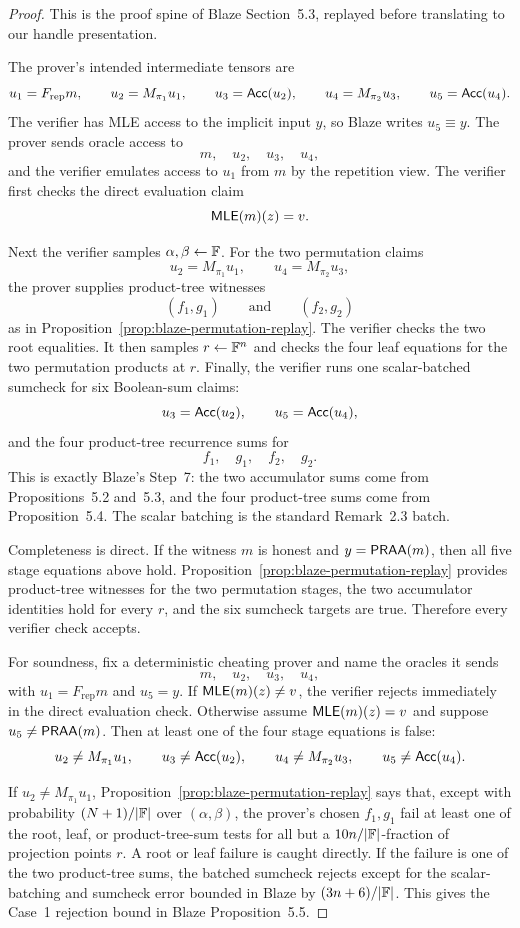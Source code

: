 \begin{proof}
This is the proof spine of Blaze Section~5.3, replayed before translating to
our handle presentation.

The prover's intended intermediate tensors are
\[
  u_1=F_{\mathrm{rep}}m,\qquad
  u_2=M_{\pi_1}u_1,\qquad
  u_3=\mathsf{Acc}(u_2),\qquad
  u_4=M_{\pi_2}u_3,\qquad
  u_5=\mathsf{Acc}(u_4).
\]
The verifier has MLE access to the implicit input \(y\), so Blaze writes
\(u_5\equiv y\).  The prover sends oracle access to
\[
  m,\quad u_2,\quad u_3,\quad u_4,
\]
and the verifier emulates access to \(u_1\) from \(m\) by the repetition view.
The verifier first checks the direct evaluation claim
\[
  \mathsf{MLE}(m)(z)=v.
\]

Next the verifier samples \(\alpha,\beta\leftarrow\mathbb{F}\).  For the two
permutation claims
\[
  u_2=M_{\pi_1}u_1,
  \qquad
  u_4=M_{\pi_2}u_3,
\]
the prover supplies product-tree witnesses
\[
  (f_1,g_1)
  \qquad\text{and}\qquad
  (f_2,g_2)
\]
as in Proposition~\ref{prop:blaze-permutation-replay}.  The verifier checks the
two root equalities.  It then samples \(r\leftarrow\mathbb{F}^n\) and checks the four
leaf equations for the two permutation products at \(r\).  Finally, the
verifier runs one scalar-batched sumcheck for six Boolean-sum claims:
\[
  u_3=\mathsf{Acc}(u_2),\qquad
  u_5=\mathsf{Acc}(u_4),
\]
and the four product-tree recurrence sums for
\[
  f_1,\quad g_1,\quad f_2,\quad g_2.
\]
This is exactly Blaze's Step~7: the two accumulator sums come from
Propositions~5.2 and~5.3, and the four product-tree sums come from
Proposition~5.4.  The scalar batching is the standard Remark~2.3 batch.

Completeness is direct.  If the witness \(m\) is honest and \(y=\mathsf{PRAA}(m)\),
then all five stage equations above hold.  Proposition~\ref{prop:blaze-permutation-replay}
provides product-tree witnesses for the two permutation stages, the two
accumulator identities hold for every \(r\), and the six sumcheck targets are
true.  Therefore every verifier check accepts.

For soundness, fix a deterministic cheating prover and name the oracles it
sends
\[
  m,\quad u_2,\quad u_3,\quad u_4,
\]
with \(u_1=F_{\mathrm{rep}}m\) and \(u_5=y\).  If \(\mathsf{MLE}(m)(z)\ne v\), the
verifier rejects immediately in the direct evaluation check.  Otherwise assume
\(\mathsf{MLE}(m)(z)=v\) and suppose \(u_5\ne\mathsf{PRAA}(m)\).  Then at least one of the four
stage equations is false:
\[
  u_2\ne M_{\pi_1}u_1,\qquad
  u_3\ne\mathsf{Acc}(u_2),\qquad
  u_4\ne M_{\pi_2}u_3,\qquad
  u_5\ne\mathsf{Acc}(u_4).
\]

If \(u_2\ne M_{\pi_1}u_1\), Proposition~\ref{prop:blaze-permutation-replay}
says that, except with probability \((N+1)/|\mathbb{F}|\) over
\((\alpha,\beta)\), the prover's chosen \(f_1,g_1\) fail at least one of the
root, leaf, or product-tree-sum tests for all but a \(10n/|\mathbb{F}|\)-fraction of
projection points \(r\).  A root or leaf failure is caught directly.  If the
failure is one of the two product-tree sums, the batched sumcheck rejects
except for the scalar-batching and sumcheck error bounded in Blaze by
\((3n+6)/|\mathbb{F}|\).  This gives the Case~1 rejection bound in Blaze
Proposition~5.5.


\end{proof}
